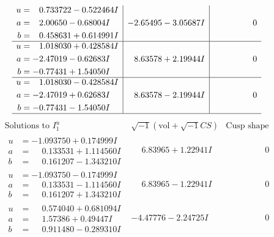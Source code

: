 \documentclass[1p]{elsarticle_modified}
\theoremstyle{definition}
\newcommand{\I}{\sqrt{-1}}
\begin{document}
$$\begin{array}{c|c|c}
\begin{aligned}
u &= \phantom{-}0.733722 - 0.522464 I \\
a &= \phantom{-}2.00650 - 0.68004 I \\
b &= \phantom{-}0.458631 + 0.614991 I\end{aligned}
 & -2.65495 - 3.05687 I & \phantom{-0.000000 } 0 \\ \hline\begin{aligned}
u &= \phantom{-}1.018030 + 0.428584 I \\
a &= -2.47019 - 0.62683 I \\
b &= -0.77431 + 1.54050 I\end{aligned}
 & \phantom{-}8.63578 + 2.19944 I & \phantom{-0.000000 } 0 \\ \hline\begin{aligned}
u &= \phantom{-}1.018030 - 0.428584 I \\
a &= -2.47019 + 0.62683 I \\
b &= -0.77431 - 1.54050 I\end{aligned}
 & \phantom{-}8.63578 - 2.19944 I & \phantom{-0.000000 } 0\\
 \hline 
 \end{array}$$\newpage$$\begin{array}{c|c|c}  
\text{Solutions to }I^u_{1}& \I (\text{vol} + \sqrt{-1}CS) & \text{Cusp shape}\\
 \hline 
\begin{aligned}
u &= -1.093750 + 0.174999 I \\
a &= \phantom{-}0.133531 + 1.114560 I \\
b &= \phantom{-}0.161207 - 1.343210 I\end{aligned}
 & \phantom{-}6.83965 + 1.22941 I & \phantom{-0.000000 } 0 \\ \hline\begin{aligned}
u &= -1.093750 - 0.174999 I \\
a &= \phantom{-}0.133531 - 1.114560 I \\
b &= \phantom{-}0.161207 + 1.343210 I\end{aligned}
 & \phantom{-}6.83965 - 1.22941 I & \phantom{-0.000000 } 0 \\ \hline\begin{aligned}
u &= \phantom{-}0.574040 + 0.681094 I \\
a &= \phantom{-}1.57386 + 0.49447 I \\
b &= \phantom{-}0.911480 - 0.289310 I\end{aligned}
 & -4.47776 - 2.24725 I & \phantom{-0.000000 } 0 \\ \hline\begin{aligned}

\end{aligned}
\end{array}$$
\end{document}

